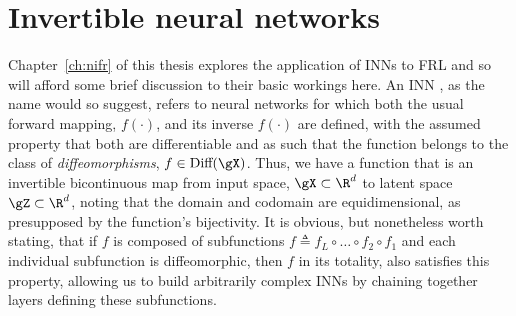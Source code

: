 \section{Invertible neural networks}\label{sec:inns}
Chapter~\ref{ch:nifr} of this thesis explores the application of \acp{INN} to \ac{FRL} and so will
afford some brief discussion to their basic workings here.
%
%
An \acl{INN} \citep{kobyzev2020normalizing}, as the name would so suggest, refers to neural
networks for which both the usual forward mapping, \(f(\cdot)\), and its inverse \(f(\cdot)\) are
defined, with the assumed property that both are differentiable and as such that the function
belongs to the class of \emph{diffeomorphisms}, \(f \in \text{Diff}(\gX)\). 
%
Thus, we have a function that is an invertible bicontinuous map from input space, \(\gX \subset
\R^d \) to latent space \(\gZ \subset \R^d \), noting that the domain and codomain are
equidimensional, as presupposed by the function's bijectivity.
%
It is obvious, but nonetheless worth stating, that if \(f\) is composed of subfunctions \(f
\triangleq f_L \circ \dots \circ f_2 \circ f_1\) and each individual subfunction is diffeomorphic,
then \(f\) in its totality, also satisfies this property, allowing us to build arbitrarily complex
\acp{INN} by chaining together layers defining these subfunctions.
%

